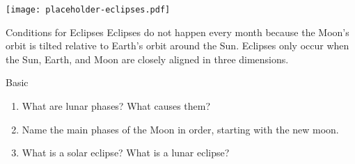 \begin{marginfigure}
\texttt{[image: placeholder-eclipses.pdf]}
\caption{\label{fig:eclipses}Diagram illustrating solar and lunar eclipses. \textit{Image to be added.}}
\end{marginfigure}

\begin{keyconcept}{Conditions for Eclipses}
Eclipses do not happen every month because the Moon's orbit is tilted relative to Earth's orbit around the Sun.  Eclipses only occur when the Sun, Earth, and Moon are closely aligned in three dimensions.
\end{keyconcept}

\begin{tieredquestions}{Basic}
\begin{enumerate}
    \item What are lunar phases? What causes them?
    \item Name the main phases of the Moon in order, starting with the new moon.
    \item What is a solar eclipse? What is a lunar eclipse?
\end{enumerate}
\end{tieredquestions}


